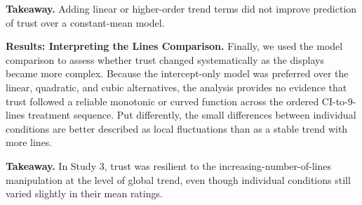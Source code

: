 \noindent\textbf{Takeaway.}
Adding linear or higher-order trend terms did not improve prediction of trust over a constant-mean model.

\noindent\textbf{Results: Interpreting the Lines Comparison.}
Finally, we used the model comparison to assess whether trust changed systematically as the displays became more complex. Because the intercept-only model was preferred over the linear, quadratic, and cubic alternatives, the analysis provides no evidence that trust followed a reliable monotonic or curved function across the ordered CI-to-9-lines treatment sequence. Put differently, the small differences between individual conditions are better described as local fluctuations than as a stable trend with more lines.

\noindent\textbf{Takeaway.}
In Study 3, trust was resilient to the increasing-number-of-lines manipulation at the level of global trend, even though individual conditions still varied slightly in their mean ratings.
